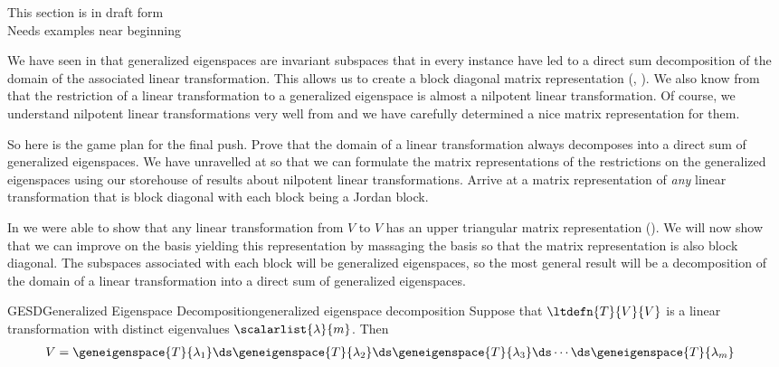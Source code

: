 %
{\sc\large This section is in draft form}\\
{\sc\large Needs examples near beginning}
\par\medskip
%
We have seen in  that generalized eigenspaces are invariant subspaces that in every instance have led to a direct sum decomposition of the domain of the associated linear transformation.  This allows us to create a block diagonal matrix representation (, ).     We also know from  that the restriction of a linear transformation to a generalized eigenspace is almost a nilpotent linear transformation.  Of course, we understand nilpotent linear transformations very well from  and we have carefully determined a nice matrix representation for them.\par
%
So here is the game plan for the final push.  Prove that the domain of a linear transformation always decomposes into a direct sum of generalized eigenspaces.  We have unravelled  at  so that we can formulate the matrix representations of the restrictions on the generalized eigenspaces using our storehouse of results about nilpotent linear transformations.  Arrive at a matrix representation of {\em any} linear transformation that is block diagonal with each block being a Jordan block.\par
%
%
In  we were able to show that any linear transformation from $V$ to $V$ has an upper triangular matrix representation ().  We will now show that we can improve on the basis yielding this representation by massaging the basis so that the matrix representation is also block diagonal.  The subspaces associated with each block will be generalized eigenspaces, so the most general result will be a decomposition of the domain of a linear transformation into a direct sum of generalized eigenspaces.
%
\begin{theorem}{GESD}{Generalized Eigenspace Decomposition}{generalized eigenspace decomposition}
Suppose that $\ltdefn{T}{V}{V}$ is a linear transformation with distinct eigenvalues $\scalarlist{\lambda}{m}$.  Then 
%
\begin{align*}
V&=
\geneigenspace{T}{\lambda_1}\ds
\geneigenspace{T}{\lambda_2}\ds
\geneigenspace{T}{\lambda_3}\ds
\cdots\ds
\geneigenspace{T}{\lambda_m}
\end{align*}
%
\end{theorem}
